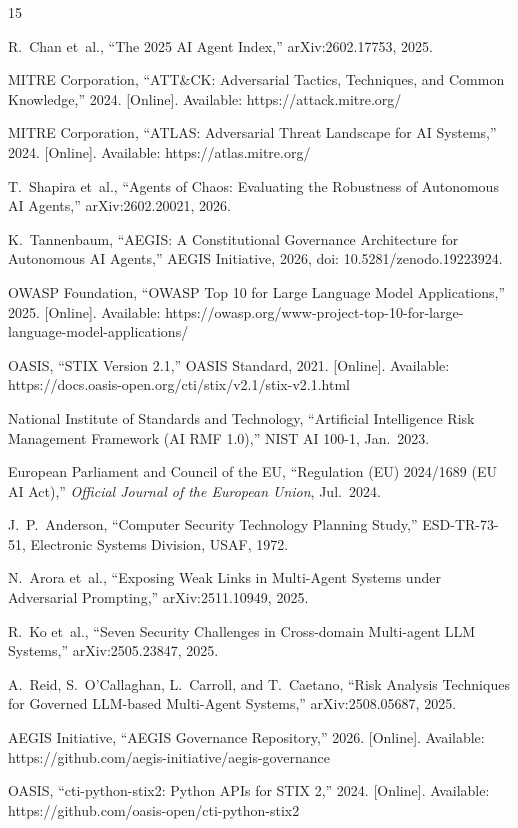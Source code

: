 \documentclass{IEEEoj-data}
\begin{document}
\begin{thebibliography}{15}

R.~Chan et~al., ``The 2025 AI Agent Index,'' arXiv:2602.17753, 2025.

MITRE Corporation, ``ATT\&CK: Adversarial Tactics, Techniques, and Common Knowledge,'' 2024. [Online]. Available: https://attack.mitre.org/

MITRE Corporation, ``ATLAS: Adversarial Threat Landscape for AI Systems,'' 2024. [Online]. Available: https://atlas.mitre.org/

T.~Shapira et~al., ``Agents of Chaos: Evaluating the Robustness of Autonomous AI Agents,'' arXiv:2602.20021, 2026.

K.~Tannenbaum, ``AEGIS: A Constitutional Governance Architecture for Autonomous AI Agents,'' AEGIS Initiative, 2026, doi: 10.5281/zenodo.19223924.

OWASP Foundation, ``OWASP Top 10 for Large Language Model Applications,'' 2025. [Online]. Available: https://owasp.org/www-project-top-10-for-large-language-model-applications/

OASIS, ``STIX Version 2.1,'' OASIS Standard, 2021. [Online]. Available: https://docs.oasis-open.org/cti/stix/v2.1/stix-v2.1.html

National Institute of Standards and Technology, ``Artificial Intelligence Risk Management Framework (AI RMF 1.0),'' NIST AI 100-1, Jan.\ 2023.

European Parliament and Council of the EU, ``Regulation (EU) 2024/1689 (EU AI Act),'' {\it Official Journal of the European Union}, Jul.\ 2024.

J.~P.~Anderson, ``Computer Security Technology Planning Study,'' ESD-TR-73-51, Electronic Systems Division, USAF, 1972.

N.~Arora et~al., ``Exposing Weak Links in Multi-Agent Systems under Adversarial Prompting,'' arXiv:2511.10949, 2025.

R.~Ko et~al., ``Seven Security Challenges in Cross-domain Multi-agent LLM Systems,'' arXiv:2505.23847, 2025.

A.~Reid, S.~O'Callaghan, L.~Carroll, and T.~Caetano, ``Risk Analysis Techniques for Governed LLM-based Multi-Agent Systems,'' arXiv:2508.05687, 2025.

AEGIS Initiative, ``AEGIS Governance Repository,'' 2026. [Online]. Available: https://github.com/aegis-initiative/aegis-governance

OASIS, ``cti-python-stix2: Python APIs for STIX 2,'' 2024. [Online]. Available: https://github.com/oasis-open/cti-python-stix2

\end{thebibliography}
\end{document}
